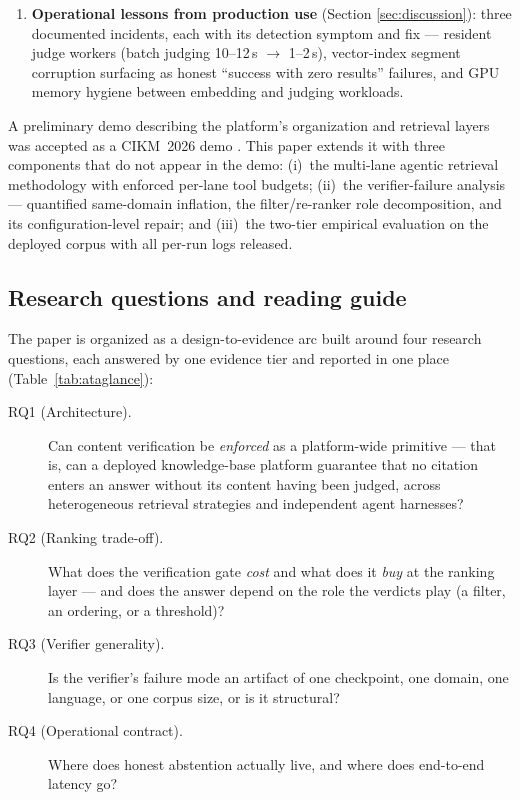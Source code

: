\begin{enumerate}
unsafe as an ordering), a threshold that never abstains out of corpus,
and robustness of both the failure and the repair to question paraphrase
and to the choice of verification signal.
Mitigations (hierarchical reading, relative cuts with floors, calibration)
are scoped to what this decomposition supports.
\item \textbf{Operational lessons from production use} (Section
\ref{sec:discussion}): three documented incidents, each with its detection
symptom and fix --- resident judge workers (batch judging 10--12\,s
$\to$ 1--2\,s), vector-index segment corruption surfacing as honest
``success with zero results'' failures, and GPU memory hygiene between
embedding and judging workloads.
\end{enumerate}

A preliminary demo describing the platform's organization and retrieval
layers was accepted as a CIKM~2026 demo \cite{qdcvr-demo}. This paper extends
it with three components that do not appear in the demo: (i)~the multi-lane
agentic retrieval methodology with enforced per-lane tool budgets; (ii)~the
verifier-failure analysis --- quantified same-domain inflation, the
filter/re-ranker role decomposition, and its configuration-level repair;
and (iii)~the two-tier empirical evaluation on the deployed corpus with all
per-run logs released.

\subsection{Research questions and reading guide}
\label{sec:rq}
The paper is organized as a design-to-evidence arc built around four research
questions, each answered by one evidence tier and reported in one place
(Table~\ref{tab:ataglance}):

\begin{description}
\item[RQ1 (Architecture).] Can content verification be \emph{enforced} as a
platform-wide primitive --- that is, can a deployed knowledge-base platform
guarantee that no citation enters an answer without its content having been
judged, across heterogeneous retrieval strategies and independent agent
harnesses?
\item[RQ2 (Ranking trade-off).] What does the verification gate \emph{cost}
and what does it \emph{buy} at the ranking layer --- and does the answer depend
on the role the verdicts play (a filter, an ordering, or a threshold)?
\item[RQ3 (Verifier generality).] Is the verifier's failure mode an artifact
of one checkpoint, one domain, one language, or one corpus size, or is it
structural?
\item[RQ4 (Operational contract).] Where does honest abstention actually live,
and where does end-to-end latency go?
\end{description}

